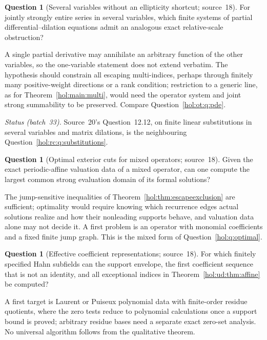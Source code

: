 \documentclass[11pt]{article}
\numberwithin{equation}{section}
\theoremstyle{definition}
\newtheorem{question}[theorem]{Question}
\theoremstyle{remark}
\begin{document}
\begin{question}[Several variables without an ellipticity shortcut;
source~18]\label{hol:ud:q:several}
For jointly strongly entire series in several variables, which finite systems
of partial differential--dilation equations admit an analogous exact
relative-scale obstruction?
\end{question}

A single partial derivative may annihilate an arbitrary function of the
other variables, so the one-variable statement does not extend verbatim. The
hypothesis should constrain all escaping multi-indices, perhaps through
finitely many positive-weight directions or a rank condition; restriction to
a generic line, as for Theorem~\ref{hol:main:multi}, would need the operator
system and joint strong summability to be preserved. Compare
Question~\ref{hol:ot:q:pde}.

\emph{Status (batch~33).} Source~20's Question~12.12, on finite linear
substitutions in several variables and matrix dilations, is the neighbouring
Question~\ref{hol:rc:q:substitutions}.

\begin{question}[Optimal exterior cuts for mixed operators; source~18]
\label{hol:ud:q:optimal}
Given the exact periodic-affine valuation data of a mixed operator, can one
compute the largest common strong evaluation domain of its formal solutions?
\end{question}

The jump-sensitive inequalities of Theorem~\ref{hol:thm:escapeexclusion} are
sufficient; optimality would require knowing which recurrence edges actual
solutions realize and how their nonleading supports behave, and valuation data
alone may not decide it. A first problem is an operator with monomial
coefficients and a fixed finite jump graph. This is the mixed form of
Question~\ref{hol:q:optimal}.

\begin{question}[Effective coefficient representations; source~18]
\label{hol:ud:q:effective}
For which finitely specified Hahn subfields can the support envelope, the
first coefficient sequence that is not an identity, and all exceptional
indices in Theorem~\ref{hol:ud:thm:affine} be computed?
\end{question}

A first target is Laurent or Puiseux polynomial data with finite-order residue
quotients, where the zero tests reduce to polynomial calculations once a
support bound is proved; arbitrary residue bases need a separate exact
zero-set analysis. No universal algorithm follows from the qualitative
theorem.
\end{document}
